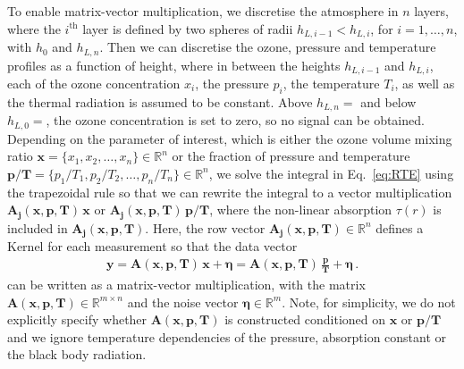 

To enable matrix-vector multiplication, we discretise the atmosphere in $n$ layers, where the $i^\text{th}$ layer is defined by two spheres of radii $h_{L,i-1} < h_{L,i}$, for $i = 1, \dots, n$, with $h_0$ and $h_{L,n} $.
Then we can discretise the ozone, pressure and temperature profiles as a function of height, where in between the heights $h_{L,i-1}$ and $h_{L,i}$, each of the ozone concentration $x_{i}$, the pressure $p_{i}$, the temperature $T_{i}$, as well as the thermal radiation is assumed to be constant.
Above $h_{L, n} = $ and below $h_{L,0} = $, the ozone concentration is set to zero, so no signal can be obtained.
Depending on the parameter of interest, which is either the ozone volume mixing ratio $\bm{x} =\{x_1,x_2,\ldots,x_n\} \in \mathbb{R}^{n}$ or the fraction of pressure and temperature $\bm{p/T}= \{p_1/T_1,p_2/T_2,\ldots,p_n/T_n\} \in \mathbb{R}^{n} $, we solve the integral in Eq.~\eqref{eq:RTE} using the trapezoidal rule so that we can rewrite the integral to a vector multiplication $\bm{A_{j}}(\bm{x},  \bm{p},\bm{T}) \, \bm{x} $ or $\bm{A_{j}}(\bm{x},  \bm{p},\bm{T}) \, \bm{p}/ \bm{T} $, where the non-linear absorption $\tau(r)$ is included in $\bm{A_{j}}(\bm{x},  \bm{p},\bm{T})$.
Here, the row vector $\bm{A_{j}}(\bm{x},  \bm{p},\bm{T}) \in \mathbb{R}^{n}$  defines a Kernel for each measurement so that the data vector
\begin{align}
	\bm{y} = \bm{A}(\bm{x},  \bm{p},\bm{T}) \, \bm{x} + \bm{\eta}= \bm{A}(\bm{x},  \bm{p},\bm{T}) \,
	\frac{ \bm{p}}{\bm{T}} + \bm{\eta} \, .
\end{align}
can be written as a matrix-vector multiplication, with the matrix $\bm{A}(\bm{x},  \bm{p},\bm{T}) \in \mathbb{R}^{m \times n}$ and the noise vector $\bm{\eta} \in \mathbb{R}^{m}$.
Note, for simplicity, we do not explicitly specify whether $\bm{A}(\bm{x}, \bm{p}, \bm{T})$ is constructed conditioned on $\bm{x}$ or $\bm{p}/\bm{T}$ and we ignore temperature dependencies of the pressure, absorption constant or the black body radiation.

